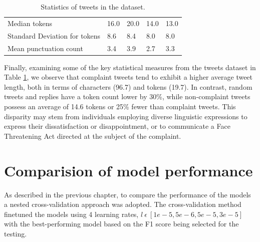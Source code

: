 \begin{table}[htbp]
\begin{tabularx}{\textwidth}{|l|X|X|X|X|}
        \rowcolor[gray]{0.9}
        Median tokens                   & 16.0                & 20.0                & 14.0                    & 13.0            \\
        Standard Deviation for tokens   & 8.6                 & 8.4                 & 8.0                     & 8.0             \\
        \hline
        \hline
        Mean punctuation count          & 3.4                 & 3.9                 & 2.7                     & 3.3             \\
        \hline
    \end{tabularx}
    \caption{Statistics of tweets in the dataset.}
    \label{tab: tweets_statistics}
\end{table}

Finally, examining some of the key statistical measures from the tweets dataset in Table \ref{tab: tweets_statistics}, we observe that complaint tweets tend to exhibit a higher average tweet length, both in terms of characters (96.7) and tokens (19.7). In contrast, random tweets and replies have a token count lower by 30\%, while non-complaint tweets possess an average of 14.6 tokens or 25\% fewer than complaint tweets. This disparity may stem from individuals employing diverse linguistic expressions to express their dissatisfaction or disappointment, or to communicate a Face Threatening Act directed at the subject of the complaint.

\section{Comparision of model performance}
As described in the previous chapter, to compare the performance of the models a nested cross-validation approach was adopted. The cross-validation method finetuned the models using 4 learning rates, $l\:\epsilon\:[1e-5, 5e-6, 5e-5, 3e-5]$ with the best-performing model based on the F1 score being selected for the testing. 

